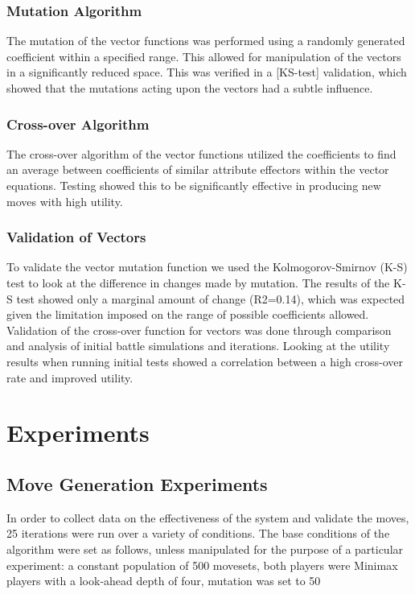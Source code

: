 \documentclass{acm_proc_article-sp}
\begin{document}
\subsubsection{Mutation Algorithm}
The mutation of the vector functions was performed using a randomly generated coefficient within a specified range. This allowed for manipulation of the vectors in a significantly reduced space. This was verified in a [KS-test] validation, which showed that the mutations acting upon the vectors had a subtle influence.

\subsubsection{Cross-over Algorithm}
The cross-over algorithm of the vector functions utilized the coefficients to find an average between coefficients of similar attribute effectors within the vector equations. Testing showed this to be significantly effective in producing new moves with high utility.

\subsubsection{Validation of Vectors}
To validate the vector mutation function we used the Kolmogorov-Smirnov (K-S)  test to look at the difference in changes made by mutation. The results of the K-S test showed only a marginal amount of change (R2=0.14), which was expected given the limitation imposed on the range of possible coefficients allowed.
Validation of the cross-over function for vectors was done through comparison and analysis of initial battle simulations and iterations. Looking at the utility results when running initial tests showed a correlation between a high cross-over rate and improved utility.


\section{Experiments}

\subsection{Move Generation Experiments}
In order to collect data on the effectiveness of the system and validate the moves, 25 iterations were run over a variety of conditions. The base conditions of the algorithm were set as follows, unless manipulated for the purpose of a particular experiment: a constant population of 500 movesets, both players were Minimax players with a look-ahead depth of four, mutation was set to 50%
\end{document}
